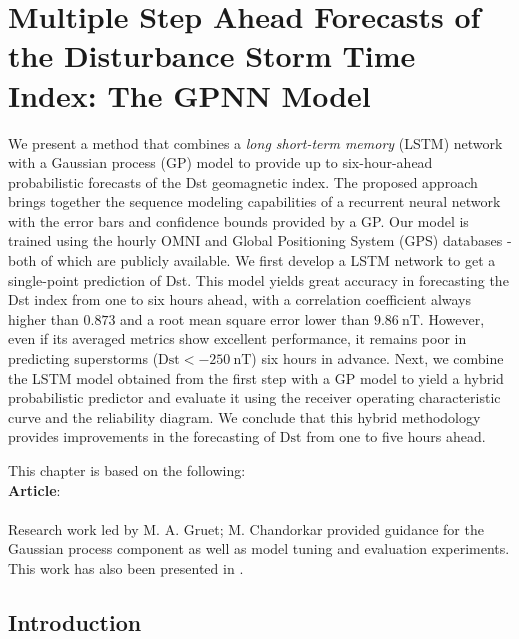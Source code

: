 \chapter{Multiple Step Ahead Forecasts of the Disturbance Storm Time Index: The GPNN Model}\label{chapter:dst_msa}

{\small
	We present a method that combines a \emph{long short-term memory} (LSTM) network with a 
	Gaussian process (GP) model to provide up to six-hour-ahead probabilistic forecasts of the Dst 
	geomagnetic index. The proposed approach brings together the sequence modeling capabilities of 
	a recurrent neural network with the error bars and confidence bounds provided by a GP. Our 
	model is trained using the hourly OMNI and Global Positioning System (GPS) databases - both of 
	which are publicly available. We first develop a LSTM network to get a single-point prediction 
	of Dst. This model yields great accuracy in forecasting the Dst index from one to six hours 
	ahead, with a correlation coefficient always higher than $0.873$ and a root mean square error 
	lower than $\SI{9.86}{\nano\tesla}$. However, even if its averaged metrics show excellent 
	performance, it remains poor in predicting superstorms 
	($\mathrm{Dst} < \SI{-250}{\nano\tesla}$) six hours in advance. Next, we combine the LSTM model 
	obtained from the first step with a GP model to yield a hybrid probabilistic predictor and 
	evaluate it using the receiver operating characteristic curve and the reliability diagram. We 
	conclude that this hybrid methodology provides improvements in the forecasting of 
	$\mathrm{Dst}$ from one to five hours ahead.

}
	

\vfill
{}
\vfill

\noindent
	\parbox{\textwidth}{%
		{\small This chapter is based on the following:\\

		\textbf{Article}:\\
		 \\
		Research work led by M. A. Gruet; M. Chandorkar provided guidance for 
		the Gaussian process component as well as model tuning and evaluation 
		experiments. This work has also been presented in 
		\citet[ch.~5]{gruet2018intelligence}.
		}
    }%

\clearpage

\section{Introduction}

